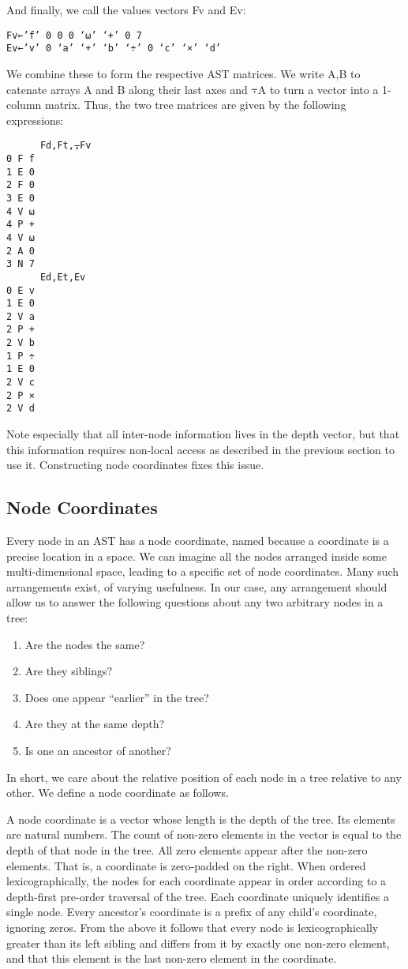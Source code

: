 \documentclass[pldi]{sigplanconf-pldi15}
\begin{document}
And finally, we call the values vectors Fv and Ev:

\begin{verbatim}
Fv←’f’ 0 0 0 ‘⍵’ ‘+’ 0 7
Ev←’v’ 0 ‘a’ ‘+’ ‘b’ ‘÷’ 0 ‘c’ ‘×’ ‘d’
\end{verbatim}

We combine these to form the respective AST matrices. We write A,B to catenate arrays A and B along their 
last axes and ⍪A to turn a vector into a 1-column matrix. Thus, the two tree matrices are given by the 
following expressions:

\begin{verbatim}
      Fd,Ft,⍪Fv
0 F f
1 E 0
2 F 0
3 E 0
4 V ⍵
4 P +
4 V ⍵
2 A 0
3 N 7
      Ed,Et,Ev
0 E v
1 E 0
2 V a
2 P +
2 V b
1 P ÷
1 E 0
2 V c
2 P ×
2 V d
\end{verbatim}

Note especially that all inter-node information lives in the depth vector, but that this information requires 
non-local access as described in the previous section to use it. Constructing node coordinates fixes this issue.
\subsection{Node Coordinates}

Every node in an AST has a node coordinate, named because a coordinate is a precise location in a space. 
We can imagine all the nodes arranged inside some multi-dimensional space, leading to a specific set of 
node coordinates. Many such arrangements exist, of varying usefulness. In our case, any arrangement 
should allow us to answer the following questions about any two arbitrary nodes in a tree:

\begin{enumerate}[noitemsep]
\item Are the nodes the same?
\item Are they siblings?
\item Does one appear “earlier” in the tree?
\item Are they at the same depth?
\item Is one an ancestor of another?
\end{enumerate}

In short, we care about the relative position of each node in a tree relative to any other. We define a node 
coordinate as follows.

A node coordinate is a vector whose length is the depth of the tree. Its elements are natural numbers. 
The count of non-zero elements in the vector is equal to the depth of that node in the tree. All zero elements
appear after the non-zero elements. That is, a coordinate is zero-padded on the right. When ordered 
lexicographically, the nodes for each coordinate appear in order according to a depth-first pre-order 
traversal of the tree. Each coordinate uniquely identifies a single node. Every ancestor’s coordinate is a 
prefix of any child’s coordinate, ignoring zeros. From the above it follows that every node is lexicographically 
greater than its left sibling and differs from it by exactly one non-zero element, and that this element is the 
last non-zero element in the coordinate. 
\end{document}
